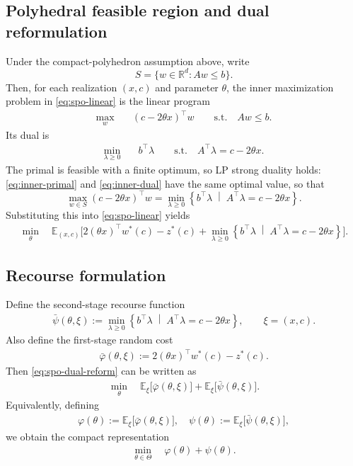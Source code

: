 \documentclass[11pt]{article}
\theoremstyle{definition}
\begin{document}
\subsection{Polyhedral feasible region and dual reformulation}

Under the compact-polyhedron assumption above, write
\[
S=\{w\in\mathbb{R}^d:Aw\le b\}.
\]
Then, for each realization $(x,c)$ and parameter $\theta$, the inner maximization problem in \eqref{eq:spo-linear} is the linear program
\begin{align}
\max_{w} \quad & (c-2\theta x)^\top w \qquad
\text{s.t.}\quad Aw\le b.
\label{eq:inner-primal}
\end{align}
Its dual is
\begin{align}
\min_{\lambda\ge 0}\quad & b^\top \lambda\qquad
\text{s.t.}\quad A^\top \lambda = c-2\theta x.
\label{eq:inner-dual}
\end{align}
The primal is feasible with a finite optimum, so LP strong duality holds: \eqref{eq:inner-primal} and \eqref{eq:inner-dual} have the same optimal value, so that
\[
\max_{w\in S}(c-2\theta x)^\top w
=
\min_{\lambda\ge 0}
\left\{
b^\top \lambda
\;\middle|\;
A^\top \lambda = c-2\theta x
\right\}.
\]
Substituting this into \eqref{eq:spo-linear} yields
\begin{align}
\min_{\theta}\quad
\mathbb{E}_{(x,c)}\Bigg[
2(\theta x)^\top w^*(c)-z^*(c)
+
\min_{\lambda\ge 0}
\left\{
b^\top \lambda
\;\middle|\;
A^\top \lambda = c-2\theta x
\right\}
\Bigg].
\label{eq:spo-dual-reform}
\end{align}

\subsection{Recourse formulation}

Define the second-stage recourse function
\begin{align}
\bar\psi(\theta,\xi)
:=
\min_{\lambda\ge 0}
\left\{
b^\top \lambda
\;\middle|\;
A^\top \lambda = c-2\theta x
\right\},
\qquad
\xi=(x,c).
\label{eq:recourse}
\end{align}
Also define the first-stage random cost
\begin{align}
\bar\varphi(\theta,\xi)
:=
2(\theta x)^\top w^*(c)-z^*(c).
\label{eq:first-stage-random-cost}
\end{align}
Then \eqref{eq:spo-dual-reform} can be written as
\begin{align}
\min_{\theta}\quad
\mathbb{E}_{\xi}\big[\bar\varphi(\theta,\xi)\big]
+
\mathbb{E}_{\xi}\big[\bar\psi(\theta,\xi)\big].
\label{eq:two-stage-basic}
\end{align}
Equivalently, defining
\begin{align}
\varphi(\theta):=\mathbb{E}_{\xi}\big[\bar\varphi(\theta,\xi)\big], \quad \psi(\theta):=\mathbb{E}_{\xi}\big[\bar\psi(\theta,\xi)\big], 
\end{align}
we obtain the compact representation
\begin{align}
\min_{\theta\in\Theta}\quad \varphi(\theta)+\psi(\theta).
\label{eq:compact-two-stage}
\end{align}
\end{document}
